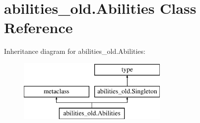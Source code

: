\hypertarget{classabilities__old_1_1_abilities}{}\section{abilities\+\_\+old.\+Abilities Class Reference}
\label{classabilities__old_1_1_abilities}
Inheritance diagram for abilities\+\_\+old.\+Abilities\+:\begin{figure}[H]
\begin{center}
\leavevmode
\includegraphics[height=3.000000cm]{classabilities__old_1_1_abilities}
\end{center}
\end{figure}
